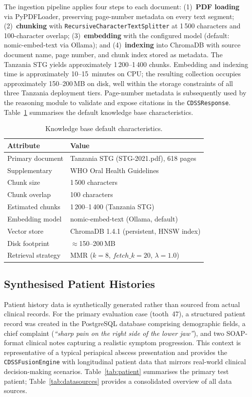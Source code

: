 \documentclass[12pt,a4paper]{report}
\begin{document}
The ingestion pipeline applies four steps to each document:
(1)~\textbf{PDF loading} via PyPDFLoader, preserving page-number
metadata on every text segment; (2)~\textbf{chunking} with
\texttt{RecursiveCharacterTextSplitter} at 1\,500 characters and
100-character overlap; (3)~\textbf{embedding} with the configured model
(default: nomic-embed-text via Ollama); and (4)~\textbf{indexing} into
ChromaDB with source document name, page number, and chunk index stored
as metadata.  The Tanzania STG yields approximately 1\,200--1\,400
chunks.  Embedding and indexing time is approximately 10--15~minutes on
CPU; the resulting collection occupies approximately 150--200\,MB on
disk, well within the storage constraints of all three Tanzania
deployment tiers.  Page-number metadata is subsequently used by the
reasoning module to validate and expose citations in the
\texttt{CDSSResponse}.  Table~\ref{tab:kb} summarises the default
knowledge base characteristics.

\begin{table}[H]
\centering
\caption{Knowledge base default characteristics.}
\label{tab:kb}
\small
\begin{tabular}{@{}ll@{}}
\toprule
\textbf{Attribute} & \textbf{Value} \\
\midrule
Primary document  & Tanzania STG (STG-2021.pdf), 618 pages \\
Supplementary     & WHO Oral Health Guidelines \\
Chunk size        & 1\,500 characters \\
Chunk overlap     & 100 characters \\
Estimated chunks  & 1\,200--1\,400 (Tanzania STG) \\
Embedding model   & nomic-embed-text (Ollama, default) \\
Vector store      & ChromaDB 1.4.1 (persistent, HNSW index) \\
Disk footprint    & $\approx$150--200\,MB \\
Retrieval strategy& MMR ($k{=}8$, $\mathit{fetch\_k}{=}20$, $\lambda{=}1.0$) \\
\bottomrule
\end{tabular}
\end{table}

\subsection{Synthesised Patient Histories}
\label{subsec:patients}

Patient history data is synthetically generated rather than sourced from
actual clinical records.  For the primary evaluation case (tooth~47),
a structured patient record was created in the PostgreSQL database
comprising demographic fields, a chief complaint (\textit{``sharp pain
on the right side of the lower jaw''}), and two SOAP-format clinical
notes capturing a realistic symptom progression.  This context is
representative of a typical periapical abscess presentation and provides
the \texttt{CDSSFusionEngine} with longitudinal patient data that mirrors
real-world clinical decision-making scenarios.  Table~\ref{tab:patient}
summarises the primary test patient; Table~\ref{tab:datasources}
provides a consolidated overview of all data sources.
\end{document}
